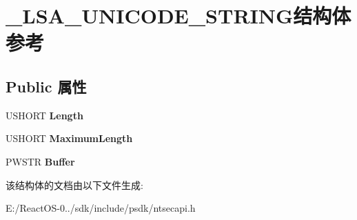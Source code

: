 \hypertarget{struct___l_s_a___u_n_i_c_o_d_e___s_t_r_i_n_g}{}\section{\+\_\+\+L\+S\+A\+\_\+\+U\+N\+I\+C\+O\+D\+E\+\_\+\+S\+T\+R\+I\+N\+G结构体 参考}
\label{struct___l_s_a___u_n_i_c_o_d_e___s_t_r_i_n_g}
\subsection*{Public 属性}
\begin{DoxyCompactItemize}
\item 
\mbox{\label{struct___l_s_a___u_n_i_c_o_d_e___s_t_r_i_n_g_ac83987b25d7149793cd903363d4efb07}} 
U\+S\+H\+O\+RT {\bfseries Length}
\item 
\mbox{\label{struct___l_s_a___u_n_i_c_o_d_e___s_t_r_i_n_g_af6d30ab2afe006a6b409b6832aa7c3bb}} 
U\+S\+H\+O\+RT {\bfseries Maximum\+Length}
\item 
\mbox{\label{struct___l_s_a___u_n_i_c_o_d_e___s_t_r_i_n_g_a10fd8d60edf1dd3b4916b69b46ad4342}} 
P\+W\+S\+TR {\bfseries Buffer}
\end{DoxyCompactItemize}


该结构体的文档由以下文件生成\+:\begin{DoxyCompactItemize}
\item 
E\+:/\+React\+O\+S-\/0../sdk/include/psdk/ntsecapi.\+h\end{DoxyCompactItemize}
